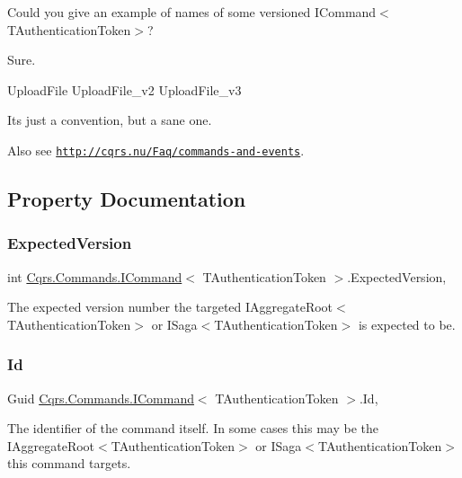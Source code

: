 Could you give an example of names of some versioned I\+Command$<$\+T\+Authentication\+Token$>$?

Sure.

Upload\+File Upload\+File\+\_\+v2 Upload\+File\+\_\+v3

It\textquotesingle{}s just a convention, but a sane one. 

 Also see \href{http://cqrs.nu/Faq/commands-and-events}{\tt http\+://cqrs.\+nu/\+Faq/commands-\/and-\/events}. 

\subsection{Property Documentation}
\mbox{\label{interfaceCqrs_1_1Commands_1_1ICommand_a8b207da81f36bd4426e83e2ec948eb49_a8b207da81f36bd4426e83e2ec948eb49}} 
\subsubsection{\texorpdfstring{Expected\+Version}{ExpectedVersion}}
{\footnotesize\ttfamily int \hyperlink{interfaceCqrs_1_1Commands_1_1ICommand}{Cqrs.\+Commands.\+I\+Command}$<$ T\+Authentication\+Token $>$.Expected\+Version\hspace{0.3cm}{\ttfamily [get]}, {\ttfamily [set]}}



The expected version number the targeted I\+Aggregate\+Root$<$\+T\+Authentication\+Token$>$ or I\+Saga$<$\+T\+Authentication\+Token$>$ is expected to be. 

\mbox{\label{interfaceCqrs_1_1Commands_1_1ICommand_a79acca2013a08295cef32f1917d97e96_a79acca2013a08295cef32f1917d97e96}} 
\subsubsection{\texorpdfstring{Id}{Id}}
{\footnotesize\ttfamily Guid \hyperlink{interfaceCqrs_1_1Commands_1_1ICommand}{Cqrs.\+Commands.\+I\+Command}$<$ T\+Authentication\+Token $>$.Id\hspace{0.3cm}{\ttfamily [get]}, {\ttfamily [set]}}



The identifier of the command itself. In some cases this may be the I\+Aggregate\+Root$<$\+T\+Authentication\+Token$>$ or I\+Saga$<$\+T\+Authentication\+Token$>$ this command targets. 

